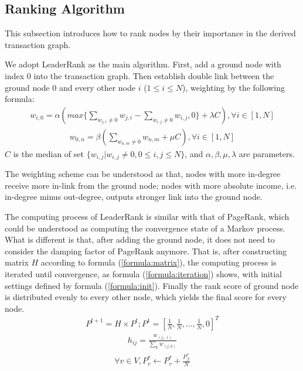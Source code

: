 \subsection{Ranking Algorithm} \label{subsec:leaderrank}
This subsection introduces how to rank nodes by their importance in the derived transaction graph.

We adopt LeaderRank\cite{Chen2013}\cite{Li2014} as the main algorithm. First, add a ground node with index $0$ into the transaction graph. Then establish double link between the ground node $0$ and every other node $i$ ($1 \leq i \leq N$), weighting by the following formula:
\begin{align}\label{formula:weight1}
w_{i,0} = \alpha( max\{ \sum_{w_{j,i} \neq 0} w_{j,i} - \sum_{w_{i,j} \neq 0} w_{i,j} , 0\} + \lambda C ), \forall i \in [1,N]	
\end{align}
\begin{align}\label{formula:weight2} 
w_{0,n}	= \beta ( \sum_{w_{n,m} \neq 0} w_{n,m} + \mu C), \forall i \in [1,N]
\end{align}
$C$ is the median of set $\{w_{i,j} | w_{i,j} \neq 0, 0\leq i,j \leq N\}$, and $\alpha, \beta, \mu, \lambda$ are parameters. 

The weighting scheme can be understood as that, nodes with more in-degree receive more in-link from the ground node; nodes with more absolute income, i.e. in-degree minus out-degree, outputs stronger link into the ground node. 

The computing process of LeaderRank is similar with that of PageRank, which could be understood as computing the convergence state of a Markov process. What is different is that, after adding the ground node, it does not need to consider the damping factor of PageRank\cite{Brin2010}\cite{page1999pagerank} anymore. That is, after constructing matrix $H$ according to formula (\ref{formula:matrix}), the computing process is iterated until convergence, as formula (\ref{formula:iteration}) shows, with initial settings defined by formula (\ref{formula:init}). Finally the rank score of ground node is distributed evenly to every other node, which yields the final score for every node.
\begin{align} \label{formula:iteration}
	P^{t+1} = H \times P^{t}; P^1=[\frac{1}{N}, \frac{1}{N}, \dots, \frac{1}{N}, 0]^T
\end{align}
\begin{align} \label{formula:matrix}
	h_{ij} = \frac{w_{(j，i)}}{\sum_k w_{(j,k)}}
\end{align}
\begin{align} \label{formula:init}
\forall v \in V, P^*_v \leftarrow P^*_v + \frac{P^*_{\mathcal{G}}}{N}
\end{align}

